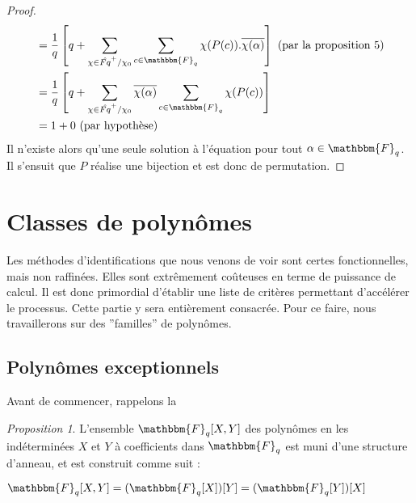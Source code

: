 \documentclass[12pt]{article}
\theoremstyle{remark}\newtheorem{note}{Note}
\theoremstyle{remark}\newtheorem{nota}{Notation}
\newcommand{\Fq}{\mathbbm{F}_q}
\newtheorem{prop}{Proposition}
\theoremstyle{definition}
\begin{document}
\begin{proof}
\begin{align*}
&= \displaystyle \frac{1}{q}\left[q+\sum_{\chi \in \hat{Fq}^+/\chi_0} \sum_{c\in\Fq} \chi(P(c)).\overline{\chi(\alpha)}\right]  \text{   (par la proposition 5)}\\
&= \displaystyle \frac{1}{q}\left[q+\sum_{\chi \in \hat{Fq}^+/\chi_0} \overline{\chi(\alpha)}\sum_{c\in\Fq} \chi(P(c))\right]\\
&= 1 + 0  \text{   (par hypothèse)}
\end{align*}
Il n'existe alors qu'une seule solution à l'équation pour tout $\alpha \in \Fq$. Il s'ensuit que $P$ réalise une bijection et est donc de permutation.
\end{proof}
\section{Classes de polynômes}
Les méthodes d'identifications que nous venons de voir sont certes fonctionnelles, mais non raffinées. Elles sont extrêmement coûteuses en terme de puissance de calcul. Il est donc primordial d'établir une liste de critères permettant d'accélérer le processus. Cette partie y sera entièrement consacrée. Pour ce faire, nous travaillerons sur des ''familles'' de polynômes. 

\subsection{Polynômes exceptionnels}
Avant de commencer, rappelons la 

\begin{prop}
L'ensemble $\Fq[X,Y]$ des polynômes en les indéterminées $X$ et $Y$ à coefficients dans $\Fq$ est muni d'une structure d'anneau, et est construit comme suit :
\begin{center} $\Fq[X,Y] = (\Fq[X])[Y] = (\Fq[Y])[X]$ \end{center}
\end{prop}
\end{document}
